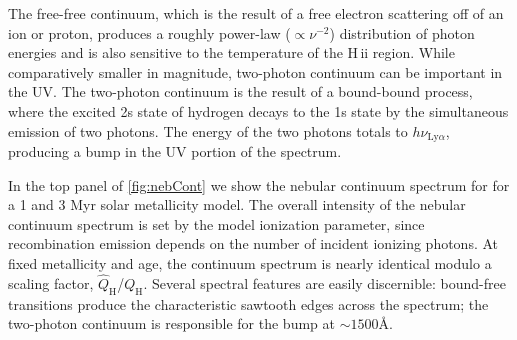 \documentclass[twocolumn, tighten]{aastex61}
\newcommand{\Fig}[1]{\autoref{fig:#1}}
\newcommand{\hii}{H\,{\sc ii}\xspace}
\newcommand{\ang}{\ensuremath{\mbox{\AA}}}
\newcommand{\QH}{\ensuremath{Q_{\mathrm{H}}}}
\newcommand{\QHat}{\ensuremath{\hat{Q}_{\mathrm{H}}}}
\begin{document}
The free-free continuum, which is the result of a free electron scattering off of an ion or proton, produces a roughly power-law ($\propto \nu^{-2}$) distribution of photon energies and is also sensitive to the temperature of the \hii region. While comparatively smaller in magnitude, two-photon continuum can be important in the UV. The two-photon continuum is the result of a bound-bound process, where the excited 2s state of hydrogen decays to the 1s state by the simultaneous emission of two photons. The energy of the two photons totals to $h\nu_{\mathrm{Ly}\alpha}$, producing a bump in the UV portion of the spectrum.

In the top panel of \Fig{nebCont} we show the nebular continuum spectrum for for a 1 and 3 Myr solar metallicity model. The overall intensity of the nebular continuum spectrum is set by the model ionization parameter, since recombination emission depends on the number of incident ionizing photons. At fixed metallicity and age, the continuum spectrum is nearly identical modulo a scaling factor, \QHat{}/\QH{}. Several spectral features are easily discernible: bound-free transitions produce the characteristic sawtooth edges across the spectrum; the two-photon continuum is responsible for the bump at ${\sim}1500 \ang$.
\end{document}
